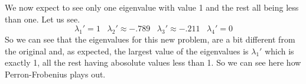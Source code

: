 \documentclass[11pt]{article}
\begin{document}
\begin{enumerate}
            We now expect to see only one eigenvalue with value 1 and the 
            rest all being less than one. Let us see.
            \[
                \lambda_1' = 1\;\;\; 
                \lambda_2' \approx -.789 \;\;\;
                \lambda_3' \approx -.211 \;\;\; 
                \lambda_4' = 0
            \]
            So we can see that the eigenvalues for this new problem, are a bit
            different from the original and, as expected, the largest value of
            the eigenvalues is $\lambda_1'$ which is exactly 1, all the rest
            having abosolute values less than 1. So we can see here how
            Perron-Frobenius plays out.

    \end{enumerate}
\end{document}
